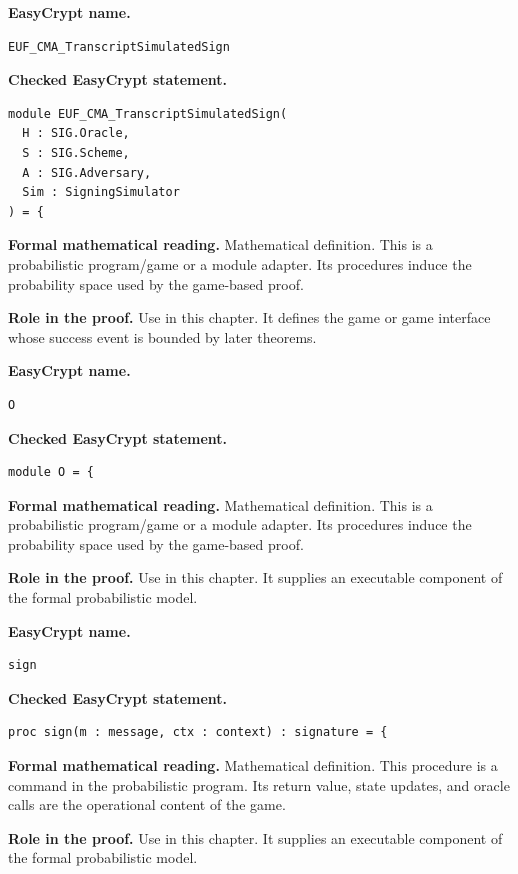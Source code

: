 \begin{formaldefinition}
\noindent\textbf{EasyCrypt name.}
\begin{lstlisting}[language=EasyCrypt,basicstyle=\ttfamily\scriptsize]
EUF_CMA_TranscriptSimulatedSign
\end{lstlisting}
\noindent\textbf{Checked EasyCrypt statement.}
\begin{lstlisting}[language=EasyCrypt,basicstyle=\ttfamily\scriptsize]
module EUF_CMA_TranscriptSimulatedSign(
  H : SIG.Oracle,
  S : SIG.Scheme,
  A : SIG.Adversary,
  Sim : SigningSimulator
) = {
\end{lstlisting}
\noindent\textbf{Formal mathematical reading.}
Mathematical definition. This is a probabilistic program/game or a module adapter.  Its procedures induce the probability space used by the game-based proof.

\noindent\textbf{Role in the proof.}
Use in this chapter. It defines the game or game interface whose success event is bounded by later theorems.

\end{formaldefinition}

\begin{formaldefinition}
\noindent\textbf{EasyCrypt name.}
\begin{lstlisting}[language=EasyCrypt,basicstyle=\ttfamily\scriptsize]
O
\end{lstlisting}
\noindent\textbf{Checked EasyCrypt statement.}
\begin{lstlisting}[language=EasyCrypt,basicstyle=\ttfamily\scriptsize]
module O = {
\end{lstlisting}
\noindent\textbf{Formal mathematical reading.}
Mathematical definition. This is a probabilistic program/game or a module adapter.  Its procedures induce the probability space used by the game-based proof.

\noindent\textbf{Role in the proof.}
Use in this chapter. It supplies an executable component of the formal probabilistic model.

\end{formaldefinition}

\begin{formaldefinition}
\noindent\textbf{EasyCrypt name.}
\begin{lstlisting}[language=EasyCrypt,basicstyle=\ttfamily\scriptsize]
sign
\end{lstlisting}
\noindent\textbf{Checked EasyCrypt statement.}
\begin{lstlisting}[language=EasyCrypt,basicstyle=\ttfamily\scriptsize]
proc sign(m : message, ctx : context) : signature = {
\end{lstlisting}
\noindent\textbf{Formal mathematical reading.}
Mathematical definition. This procedure is a command in the probabilistic program.  Its return value, state updates, and oracle calls are the operational content of the game.

\noindent\textbf{Role in the proof.}
Use in this chapter. It supplies an executable component of the formal probabilistic model.

\end{formaldefinition}

